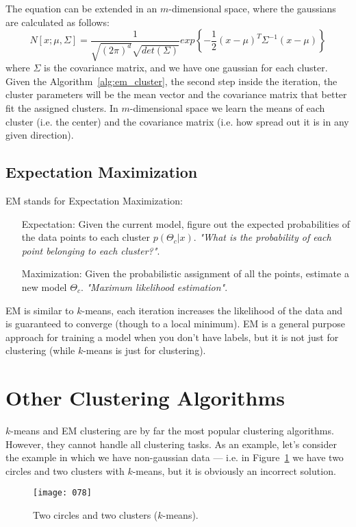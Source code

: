 The equation can be extended in an \(m\)-dimensional space, where the gaussians are calculated as follows:
\begin{equation}
    N[x; \mu, \Sigma] = \frac 1 {\sqrt{(2\pi)^d} \sqrt{det(\Sigma)}} exp \left\{ - \frac 1 2 (x - \mu)^T \Sigma^{-1} (x - \mu) \right\}
\end{equation}
where \(\Sigma\) is the covariance matrix, and we have one gaussian for each cluster. Given the Algorithm~\ref{alg:em_cluster}, the second step inside the iteration, the cluster parameters will be the mean vector and the covariance matrix that better fit the assigned clusters. In \(m\)-dimensional space we learn the means of each cluster (i.e. the center) and the covariance matrix (i.e. how spread out it is in any given direction).

\subsection{Expectation Maximization}
EM stands for Expectation Maximization:
\begin{itemize}
    \item[Expectation:] Given the current model, figure out the expected probabilities of the data points to each cluster \(p(\Theta_c | x)\). \emph{"What is the probability of each point belonging to each cluster?"}.
    \item[Maximization:] Given the probabilistic assignment of all the points, estimate a new model \(\Theta_c\). \emph{"Maximum likelihood estimation"}.
\end{itemize}

EM is similar to \(k\)-means, each iteration increases the likelihood of the data and is guaranteed to converge (though to a local minimum). EM is a general purpose approach for training a model when you don't have labels, but it is not just for clustering (while \(k\)-means is just for clustering).

\section{Other Clustering Algorithms}
\(k\)-means and EM clustering are by far the most popular clustering algorithms. However, they cannot handle all clustering tasks. As an example, let's consider the example in which we have non-gaussian data --- i.e. in Figure~\ref{fig:078} we have two circles and two clusters with \(k\)-means, but it is obviously an incorrect solution.

\begin{figure}[h!]
    \centering
    \texttt{[image: 078]}
    \caption{Two circles and two clusters (\(k\)-means).}
    \label{fig:078}
\end{figure}

